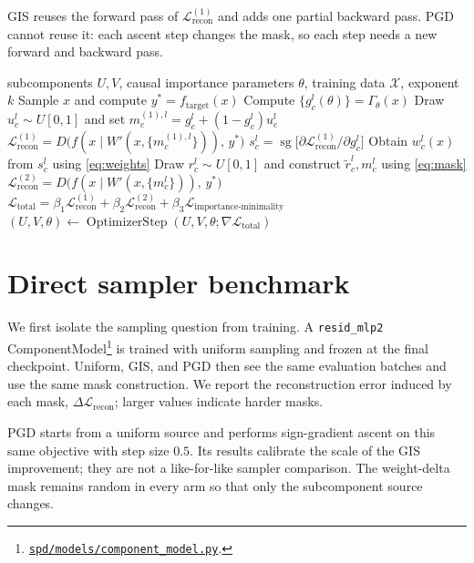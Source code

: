 \documentclass[11pt]{article}
\begin{document}
GIS reuses the forward pass of $\mathcal L_{\mathrm{recon}}^{(1)}$ and adds one partial
backward pass. PGD cannot reuse it: each ascent step changes the mask, so each step
needs a new forward and backward pass.

\begin{algorithm}[H]
\caption{Gradient-Informed Sampling}
\label{alg:gis}
\begin{algorithmic}[1]
\Require subcomponents $U,V$, causal importance parameters $\theta$, training data
$\mathcal X$, exponent $k$
    \State Sample $x$ and compute $y^*=f_{\mathrm{target}}(x)$
    \State Compute $\{g_c^l(\theta)\}=\Gamma_\theta(x)$
    \State Draw $u_c^l\sim U[0,1]$ and set $m_c^{(1),l}=g_c^l+(1-g_c^l)u_c^l$
    \State $\mathcal L_{\mathrm{recon}}^{(1)}=D\big(f(x\mid W'(x,\{m_c^{(1),l}\})),\,y^*\big)$
    \State $s_c^l=\operatorname{sg}\big[\partial\mathcal L_{\mathrm{recon}}^{(1)}/\partial g_c^l\big]$
    \State Obtain $w_c^l(x)$ from $s_c^l$ using \eqref{eq:weights}
    \State Draw $r_c^l\sim U[0,1]$ and construct $\widetilde r_c^l,m_c^l$ using \eqref{eq:mask}
    \State $\mathcal L_{\mathrm{recon}}^{(2)}=D\big(f(x\mid W'(x,\{m_c^l\})),\,y^*\big)$
    \State $\mathcal L_{\mathrm{total}}=\beta_1\mathcal L_{\mathrm{recon}}^{(1)}
    +\beta_2\mathcal L_{\mathrm{recon}}^{(2)}
    +\beta_3\mathcal L_{\mathrm{importance\text{-}minimality}}$
    \State $(U,V,\theta)\gets\operatorname{OptimizerStep}
    (U,V,\theta;\nabla\mathcal L_{\mathrm{total}})$
\EndFor
\end{algorithmic}
\end{algorithm}

\section{Direct sampler benchmark}
\label{sec:sampler_benchmark}

We first isolate the sampling question from training. A \texttt{resid\_mlp2}
ComponentModel\footnote{\href{https://github.com/chandanms/spd/blob/feature/important-sampling/spd/models/component_model.py}{\texttt{spd/models/component\_model.py}}.}
is trained with uniform sampling and frozen at the final checkpoint.
Uniform, GIS, and PGD then see the same evaluation batches and use the same mask
construction. We report the reconstruction error induced by each mask,
$\Delta\mathcal L_{\mathrm{recon}}$; larger values indicate harder masks.

PGD starts from a uniform source and performs sign-gradient ascent on this same
objective with step size $0.5$. Its results calibrate the scale of the GIS improvement;
they are not a like-for-like sampler comparison. The weight-delta mask remains random
in every arm so that only the subcomponent source changes.
\end{document}
